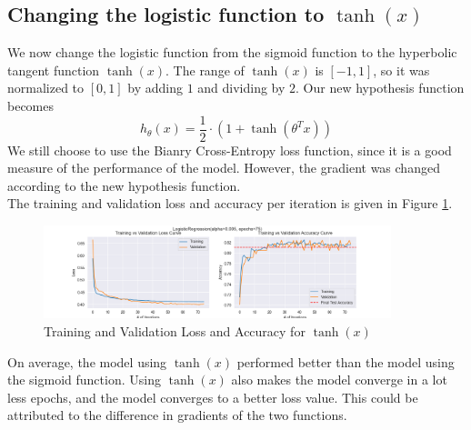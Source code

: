 \documentclass[12pt]{article}
\begin{document}
    \subsection*{Changing the logistic function to $\tanh{(x)}$}
    We now change the logistic function from the sigmoid function to the hyperbolic tangent function $\tanh{(x)}$.
    The range of $\tanh{(x)}$ is $[-1, 1]$, so it was normalized to $[0, 1]$ by adding $1$ and dividing by $2$.
    Our new hypothesis function becomes
    \begin{equation}
        h_{\theta}(x) = \frac{1}{2} \cdot (1 + \tanh{(\theta^{T} x)})
    \end{equation}
    We still choose to use the Bianry Cross-Entropy loss function, since it is a good measure of the performance of the model.
    However, the gradient was changed according to the new hypothesis function.
    \vspace*{5pt} \\
    The training and validation loss and accuracy per iteration is given in Figure \ref{fig:tanh}.
    \begin{figure}[h]
        \centering
        \includegraphics[width=0.9\textwidth]{./../Assets/tanh.png}
        \caption{Training and Validation Loss and Accuracy for $\tanh{(x)}$}
        \label{fig:tanh}
    \end{figure}
    On average, the model using $\tanh{(x)}$ performed better than the model using the sigmoid function. Using $\tanh{(x)}$
    also makes the model converge in a lot less epochs, and the model converges to a better loss value. This could be
    attributed to the difference in gradients of the two functions.
\end{document}
